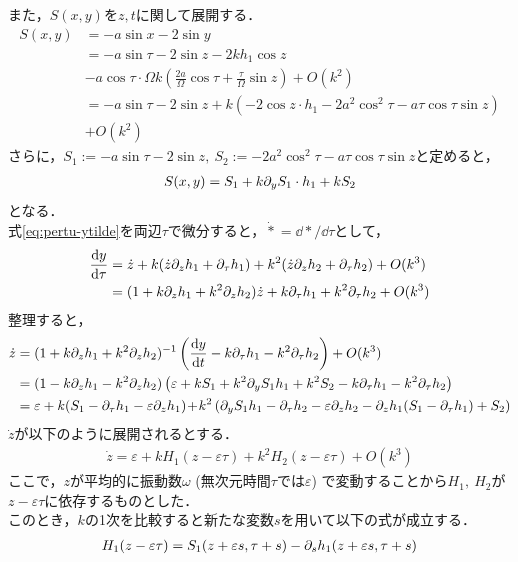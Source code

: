 \documentclass[../main]{subfiles}
\begin{document}
    また，$S(x,y)$を$z,t$に関して展開する．
    \begin{align*}
        S(x,y)&=-a\sin x-2\sin y\\
        &=-a\sin\tau-2\sin z-2 kh_1\cos z\\
        &-a\cos\tau\cdot \Omega k\left(\frac{2a}{\Omega}\cos \tau+\frac{\tau}{\Omega}\sin z\right)+O(k^2)\\
        &=-a\sin\tau-2\sin z+k\left(-2 \cos z\cdot h_1-2a^2\cos^2\tau-a\tau\cos \tau\sin z\right)\\
        &+O(k^2)
    \end{align*}
    さらに，$S_1:=-a\sin\tau-2\sin z,\ S_2:=-2a^2\cos^2\tau-a\tau\cos \tau\sin z$と定めると，
    \begin{align*}
        S(x,y)=S_1+k\partial_y S_1\cdot h_1+kS_2
    \end{align*}
    となる．\\
    式\eqref{eq:pertu-ytilde}を両辺$\tau$で微分すると，$\dot{\ast}=\dd{\ast}/\dd{\tau}$として，
    \begin{align*}
        \dv{y}{\tau}&=\dot{z}+k(\dot{z}\partial_zh_1+\partial_\tau h_1)+k^2(\dot{z}\partial_zh_2+\partial_\tau h_2)+O(k^3)\\
        &=(1+k\partial_zh_1+k^2\partial_zh_2)\dot{z}+k\partial_\tau h_1+k^2\partial_\tau h_2+O(k^3)
    \end{align*}
    整理すると，
    \begin{align*}
        \dot{z}&=(1+k\partial_zh_1+k^2\partial_zh_2)^{-1}\left( \dv{y}{t}-k\partial_\tau h_1-k^2\partial_\tau h_2 \right)+O(k^3)\\
        &=(1-k\partial_zh_1-k^2\partial_zh_2)\left(\varepsilon+kS_1+k^2 \partial_y S_1h_1+k^2S_2-k\partial_\tau h_1-k^2\partial_\tau h_2 \right)\\
        &=\varepsilon+k(S_1-\partial_\tau h_1-\varepsilon\partial_zh_1)\!+\!k^2\left(\partial_y S_1h_1 -\partial_\tau h_2-\varepsilon\partial_zh_2 -\partial_zh_1(S_1-\partial_\tau h_1)+S_2\right)
    \end{align*}
    $\dot{z}$が以下のように展開されるとする．
    \begin{align*}
        \dot{z}=\varepsilon+kH_1(z-\varepsilon \tau)+k^2H_2(z-\varepsilon \tau)+O(k^3)
    \end{align*}
    ここで，$z$が平均的に振動数$\omega$ (無次元時間$\tau$では$\varepsilon$) で変動することから$H_1,\ H_2$が$z-\varepsilon \tau$に依存するものとした．\\
    このとき，$k$の1次を比較すると新たな変数$s$を用いて以下の式が成立する．
    \begin{align*}
        H_1(z-\varepsilon \tau)=S_1(z+\varepsilon s,\tau+s)-\partial_s h_1(z+\varepsilon s,\tau+s)
    \end{align*}
\end{document}
